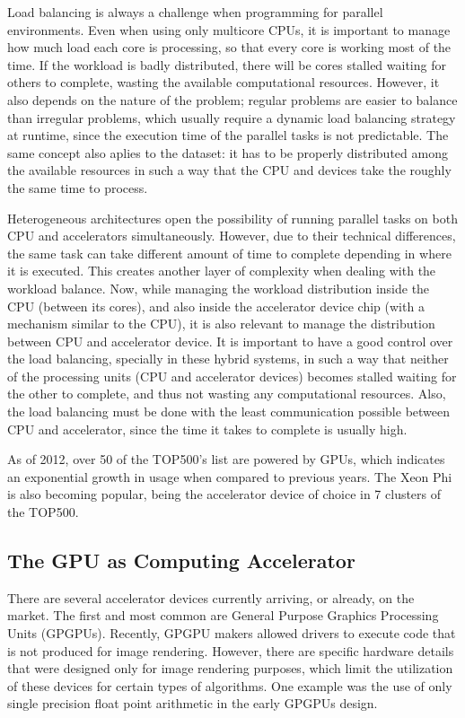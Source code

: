 Load balancing is always a challenge when programming for parallel environments. Even when using only multicore CPUs, it is important to manage how much load each core is processing, so that every core is working most of the time. If the workload is badly distributed, there will be cores stalled waiting for others to complete, wasting the available computational resources. However, it also depends on the nature of the problem; regular problems are easier to balance than irregular problems, which usually require a dynamic load balancing strategy at runtime, since the execution time of the parallel tasks is not predictable. The same concept also aplies to the dataset: it has to be properly distributed among the available resources in such a way that the CPU and devices take the roughly the same time to process.

Heterogeneous architectures open the possibility of running parallel tasks on both CPU and accelerators simultaneously. However, due to their technical differences, the same task can take different amount of time to complete depending in where it is executed. This creates another layer of complexity when dealing with the workload balance. Now, while managing the workload distribution inside the CPU (between its cores), and also inside the accelerator device chip (with a mechanism similar to the CPU), it is also relevant to manage the distribution between CPU and accelerator device. It is important to have a good control over the load balancing, specially in these hybrid systems, in such a way that neither of the processing units (CPU and accelerator devices) becomes stalled waiting for the other to complete, and thus not wasting any computational resources. Also, the load balancing must be done with the least communication possible between CPU and accelerator, since the time it takes to complete is usually high.

As of 2012, over 50 of the TOP500’s list \cite{TOP500} are powered by GPUs, which indicates an exponential growth in usage when compared to previous years. The \intel Xeon Phi is also becoming popular, being the accelerator device of choice in 7 clusters of the TOP500.

\subsection{The GPU as Computing Accelerator}

There are several accelerator devices currently arriving, or already, on the market. The first and most common are General Purpose Graphics Processing Units (GPGPUs). Recently, GPGPU makers allowed drivers to execute code that is not produced for image rendering. However, there are specific hardware details that were designed only for image rendering purposes, which limit the utilization of these devices for certain types of algorithms. One example was the use of only single precision float point arithmetic in the early GPGPUs design.

